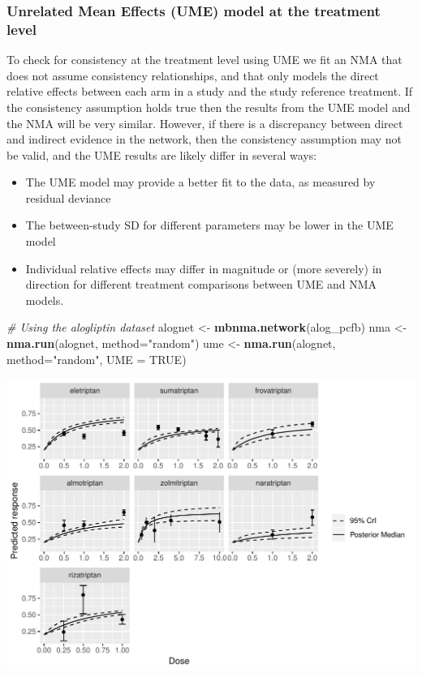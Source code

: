 \documentclass[]{article}
\newenvironment{Shaded}{\begin{snugshade}}{\end{snugshade}}
\newcommand{\CommentTok}[1]{\textcolor[rgb]{0.56,0.35,0.01}{\textit{#1}}}
\newcommand{\DataTypeTok}[1]{\textcolor[rgb]{0.13,0.29,0.53}{#1}}
\newcommand{\KeywordTok}[1]{\textcolor[rgb]{0.13,0.29,0.53}{\textbf{#1}}}
\newcommand{\NormalTok}[1]{#1}
\newcommand{\OtherTok}[1]{\textcolor[rgb]{0.56,0.35,0.01}{#1}}
\newcommand{\StringTok}[1]{\textcolor[rgb]{0.31,0.60,0.02}{#1}}
\providecommand{\tightlist}{%
  \setlength{\itemsep}{0pt}\setlength{\parskip}{0pt}}
\begin{document}
\hypertarget{unrelated-mean-effects-ume-model-at-the-treatment-level}{%
\subsubsection{Unrelated Mean Effects (UME) model at the treatment
level}\label{unrelated-mean-effects-ume-model-at-the-treatment-level}}

To check for consistency at the treatment level using UME we fit an NMA
that does not assume consistency relationships, and that only models the
direct relative effects between each arm in a study and the study
reference treatment. If the consistency assumption holds true then the
results from the UME model and the NMA will be very similar. However, if
there is a discrepancy between direct and indirect evidence in the
network, then the consistency assumption may not be valid, and the UME
results are likely differ in several ways:

\begin{itemize}
\tightlist
\item
  The UME model may provide a better fit to the data, as measured by
  residual deviance
\item
  The between-study SD for different parameters may be lower in the UME
  model
\item
  Individual relative effects may differ in magnitude or (more severely)
  in direction for different treatment comparisons between UME and NMA
  models.
\end{itemize}

\begin{Shaded}
\begin{Highlighting}[]
\CommentTok{# Using the alogliptin dataset}
\NormalTok{alognet <-}\StringTok{ }\KeywordTok{mbnma.network}\NormalTok{(alog_pcfb)}
\NormalTok{nma <-}\StringTok{ }\KeywordTok{nma.run}\NormalTok{(alognet, }\DataTypeTok{method=}\StringTok{"random"}\NormalTok{)}
\NormalTok{ume <-}\StringTok{ }\KeywordTok{nma.run}\NormalTok{(alognet, }\DataTypeTok{method=}\StringTok{"random"}\NormalTok{, }\DataTypeTok{UME =} \OtherTok{TRUE}\NormalTok{)}
\end{Highlighting}
\end{Shaded}

\includegraphics{mbnmadose_files/figure-latex/unnamed-chunk-47-1.pdf}
\end{document}

